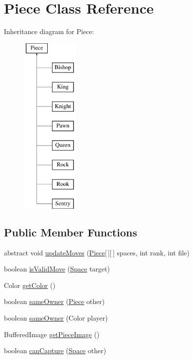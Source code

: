 \hypertarget{class_piece}{\section{Piece Class Reference}
\label{class_piece}
}
Inheritance diagram for Piece\-:\begin{figure}[H]
\begin{center}
\leavevmode
\includegraphics[height=9.000000cm]{class_piece}
\end{center}
\end{figure}
\subsection*{Public Member Functions}
\begin{DoxyCompactItemize}
\item 
abstract void \hyperlink{class_piece_a4a6c2b5c5d4dd5e3fa08f3a4cb97c9ba}{update\-Moves} (\hyperlink{class_piece}{Piece}\mbox{[}$\,$\mbox{]}\mbox{[}$\,$\mbox{]} spaces, int rank, int file)
\item 
boolean \hyperlink{class_piece_a6c777344ee49d908f6c3cf43948a204d}{is\-Valid\-Move} (\hyperlink{class_space}{Space} target)
\item 
Color \hyperlink{class_piece_a076592733b1498c5bc04ac61059eb1cc}{get\-Color} ()
\item 
boolean \hyperlink{class_piece_a3b293d270e867e61341b27df6d71c5da}{same\-Owner} (\hyperlink{class_piece}{Piece} other)
\item 
boolean \hyperlink{class_piece_a49a140768645f1ff3cb444e7667fa21d}{same\-Owner} (Color player)
\item 
Buffered\-Image \hyperlink{class_piece_af88fc508a0998bf763bef10b351481a7}{get\-Piece\-Image} ()
\item 
boolean \hyperlink{class_piece_adb1a99429bb667ed89818dbf97054e87}{can\-Capture} (\hyperlink{class_space}{Space} other)
\end{DoxyCompactItemize}

